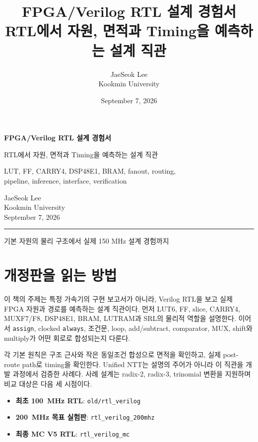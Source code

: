 \documentclass[11pt,a4paper,openany]{report}
\title{\textbf{FPGA/Verilog RTL 설계 경험서}\\[4pt]
\large RTL에서 자원, 면적과 Timing을 예측하는 설계 직관}
\author{JaeSeok Lee \\ Kookmin University}
\date{September 7, 2026}
\newcommand{\rtlfile}[1]{\texttt{#1}}
\begin{document}
\hypersetup{pageanchor=false}
\begin{titlepage}
\thispagestyle{empty}
\vspace*{0.15\textheight}
{\centering
{\Huge\bfseries\color{accent} FPGA/Verilog RTL 설계 경험서\par}
\vspace{0.8cm}
{\Large RTL에서 자원, 면적과 Timing을 예측하는 설계 직관\par}
\vspace{1.0cm}
{\large LUT, FF, CARRY4, DSP48E1, BRAM, fanout, routing,\\
pipeline, inference, interface, verification\par}
}
\vfill
{\centering \large JaeSeok Lee\\Kookmin University\\September 7, 2026\par}
\vspace{1.2cm}
\begin{center}\rule{0.82\textwidth}{0.7pt}\end{center}
\begin{center}{\large 기본 자원의 물리 구조에서 실제 150 MHz 설계 경험까지}\end{center}
\vspace*{0.06\textheight}
\end{titlepage}

\chapter*{개정판을 읽는 방법}

이 책의 주제는 특정 가속기의 구현 보고서가 아니라, Verilog RTL을 보고 실제
FPGA 자원과 경로를 예측하는 설계 직관이다. 먼저 LUT6, FF, slice, CARRY4,
MUXF7/F8, DSP48E1, BRAM, LUTRAM과 SRL의 물리적 역할을 설명한다. 이어서
\rtlfile{assign}, clocked \rtlfile{always}, 조건문, loop, add/subtract,
comparator, MUX, shift와 multiply가 어떤 회로로 합성되는지 다룬다.

각 기본 원칙은 구조 근사와 작은 동일조건 합성으로 면적을 확인하고, 실제
post-route path로 timing을 확인한다. Unified NTT는 설명의 주어가 아니라 이
직관을 개발 과정에서 검증한 사례다. 사례 설계는 radix-2, radix-3, trinomial
변환을 지원하며 비교 대상은 다음 세 시점이다.

\begin{itemize}
  \item \textbf{최초 100~MHz RTL}: \rtlfile{old/rtl\_verilog}
  \item \textbf{200~MHz 목표 실험판}: \rtlfile{rtl\_verilog\_200mhz}
  \item \textbf{최종 MC V5 RTL}: \rtlfile{rtl\_verilog\_mc}
\end{itemize}
\end{document}
